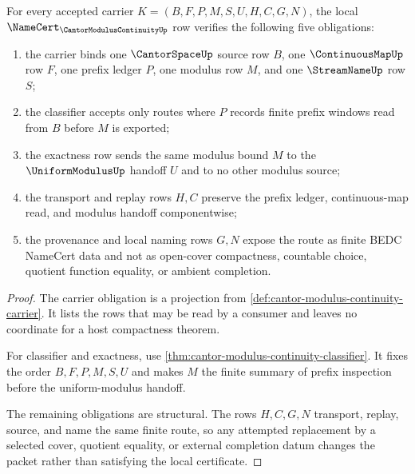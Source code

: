 \begin{theorem}
\label{thm:cantor-modulus-continuity-namecert-obligations}
For every accepted carrier $K=(B,F,P,M,S,U,H,C,G,N)$, the local $\NameCert_{\CantorModulusContinuityUp}$ row verifies the following five obligations:
\begin{enumerate}
\item the carrier binds one $\CantorSpaceUp$ source row $B$, one $\ContinuousMapUp$ row $F$, one prefix ledger $P$, one modulus row $M$, and one $\StreamNameUp$ row $S$;
\item the classifier accepts only routes where $P$ records finite prefix windows read from $B$ before $M$ is exported;
\item the exactness row sends the same modulus bound $M$ to the $\UniformModulusUp$ handoff $U$ and to no other modulus source;
\item the transport and replay rows $H,C$ preserve the prefix ledger, continuous-map read, and modulus handoff componentwise;
\item the provenance and local naming rows $G,N$ expose the route as finite BEDC NameCert data and not as open-cover compactness, countable choice, quotient function equality, or ambient completion.
\end{enumerate}
\end{theorem}
\begin{proof}
The carrier obligation is a projection from \autoref{def:cantor-modulus-continuity-carrier}. It lists the rows that may be read by a consumer and leaves no coordinate for a host compactness theorem.

For classifier and exactness, use \autoref{thm:cantor-modulus-continuity-classifier}. It fixes the order $B,F,P,M,S,U$ and makes $M$ the finite summary of prefix inspection before the uniform-modulus handoff.

The remaining obligations are structural. The rows $H,C,G,N$ transport, replay, source, and name the same finite route, so any attempted replacement by a selected cover, quotient equality, or external completion datum changes the packet rather than satisfying the local certificate.
\end{proof}


